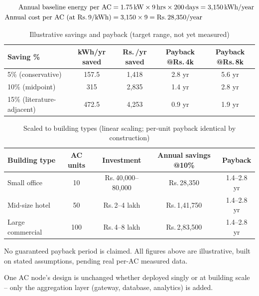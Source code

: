 \documentclass[11pt,a4paper]{article}
\newcommand{\textrupee}{Rs.\,}
\begin{document}
\begin{align}
\text{Annual baseline energy per AC} &= 1.75\,\text{kW} \times 9\,\text{hrs} \times 200\,\text{days} = 3{,}150\,\text{kWh/year} \\
\text{Annual cost per AC (at \textrupee9/kWh)} &= 3{,}150 \times 9 = \text{\textrupee}28{,}350/\text{year}
\end{align}

\begin{table}[h!]
\centering
\caption{Illustrative savings and payback (target range, not yet measured)}
\begin{tabular}{lcccc}
\toprule
\textbf{Saving \%} & \textbf{kWh/yr saved} & \textbf{\textrupee/yr saved} & \textbf{Payback @\textrupee4k} & \textbf{Payback @\textrupee8k} \\
\midrule
5\% (conservative) & 157.5 & 1{,}418 & 2.8 yr & 5.6 yr \\
10\% (midpoint) & 315 & 2{,}835 & 1.4 yr & 2.8 yr \\
15\% (literature-adjacent) & 472.5 & 4{,}253 & 0.9 yr & 1.9 yr \\
\bottomrule
\end{tabular}
\end{table}

\begin{table}[h!]
\centering
\caption{Scaled to building types (linear scaling; per-unit payback identical by construction)}
\begin{tabular}{lcccc}
\toprule
\textbf{Building type} & \textbf{AC units} & \textbf{Investment} & \textbf{Annual savings @10\%} & \textbf{Payback} \\
\midrule
Small office & 10 & \textrupee40,000--80,000 & \textrupee28,350 & 1.4--2.8 yr \\
Mid-size hotel & 50 & \textrupee2--4 lakh & \textrupee1,41,750 & 1.4--2.8 yr \\
Large commercial & 100 & \textrupee4--8 lakh & \textrupee2,83,500 & 1.4--2.8 yr \\
\bottomrule
\end{tabular}
\end{table}

\begin{limitation}
No guaranteed payback period is claimed. All figures above are illustrative, built on stated assumptions, pending real per-AC measured data.
\end{limitation}

One AC node's design is unchanged whether deployed singly or at building scale -- only the aggregation layer (gateway, database, analytics) is added.
\end{document}
